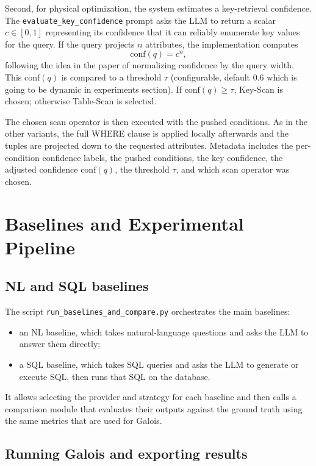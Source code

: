 \documentclass[11pt]{article}
\begin{document}
Second, for physical optimization, the system estimates a key-retrieval confidence. The \texttt{evaluate\_key\_confidence} prompt asks the LLM to return a scalar $c \in [0,1]$ representing its confidence that it can reliably enumerate key values for the query. If the query projects $n$ attributes, the implementation computes
\[
\mathrm{conf}(q) = c^{n},
\]
following the idea in the paper of normalizing confidence by the query width. This $\mathrm{conf}(q)$ is compared to a threshold $\tau$ (configurable, default $0.6$ which is going to be dynamic in experiments section). If $\mathrm{conf}(q) \ge \tau$, Key-Scan is chosen; otherwise Table-Scan is selected.

The chosen scan operator is then executed with the pushed conditions. As in the other variants, the full WHERE clause is applied locally afterwards and the tuples are projected down to the requested attributes. Metadata includes the per-condition confidence labels, the pushed conditions, the key confidence, the adjusted confidence $\mathrm{conf}(q)$, the threshold $\tau$, and which scan operator was chosen.

\section{Baselines and Experimental Pipeline}

\subsection{NL and SQL baselines}

The script \texttt{run\_baselines\_and\_compare.py} orchestrates the main baselines:

\begin{itemize}
  \item an NL baseline, which takes natural-language questions and asks the LLM to answer them directly;
  \item a SQL baseline, which takes SQL queries and asks the LLM to generate or execute SQL, then runs that SQL on the database.
\end{itemize}

It allows selecting the provider and strategy for each baseline and then calls a comparison module that evaluates their outputs against the ground truth using the same metrics that are used for Galois.

\subsection{Running Galois and exporting results}
\end{document}
